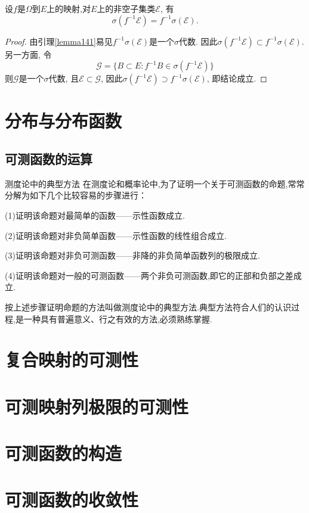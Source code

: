 \begin{theorem}
	设$f$是$\Omega$到$E$上的映射,对$E$上的非空子集类$\mathscr{E}$, 有
	\begin{equation}
	\sigma(f^{-1}\mathscr{E}) = f^{-1}\sigma(\mathscr{E}).
	\end{equation}
\end{theorem}

\begin{proof}
	由引理\ref{lemma141}易见$f^{-1}\sigma(\mathscr{E})$是一个$\sigma$代数. 因此$\sigma(f^{-1}\mathscr{E})\subset f^{-1}\sigma(\mathscr{E})$. 另一方面, 令
	\begin{equation}
	\mathscr{G} = \{ B\subset E:f^{-1}B\in\sigma(f^{-1}\mathscr{E})\}
	\end{equation}
	则$\mathscr{G}$是一个$\sigma$代数, 且$\mathscr{E}\subset\mathscr{G}$, 因此$\sigma(f^{-1}\mathscr{E})\supset f^{-1}\sigma(\mathscr{E})$, 即结论成立.
\end{proof}



\section{分布与分布函数}
\subsection{可测函数的运算}


{测度论中的典型方法}
在测度论和概率论中,为了证明一个关于可测函数的命题,常常分解为如下几个比较容易的步骤进行：
\begin{blist}
	\item (1)证明该命题对最简单的函数——示性函数成立.
	\item (2)证明该命题对非负简单函数——示性函数的线性组合成立.
	\item (3)证明该命题对非负可测函数——非降的非负简单函数列的极限成立.
	\item (4)证明该命题对一般的可测函数——两个非负可测函数,即它的正部和负部之差成立.
\end{blist}
按上述步骤证明命题的方法叫做测度论中的典型方法.典型方法符合人们的认识过程,是一种具有普遍意义、行之有效的方法,必须熟练掌握.

\section{复合映射的可测性}
\section{可测映射列极限的可测性}
\section{可测函数的构造}
\section{可测函数的收敛性}	

